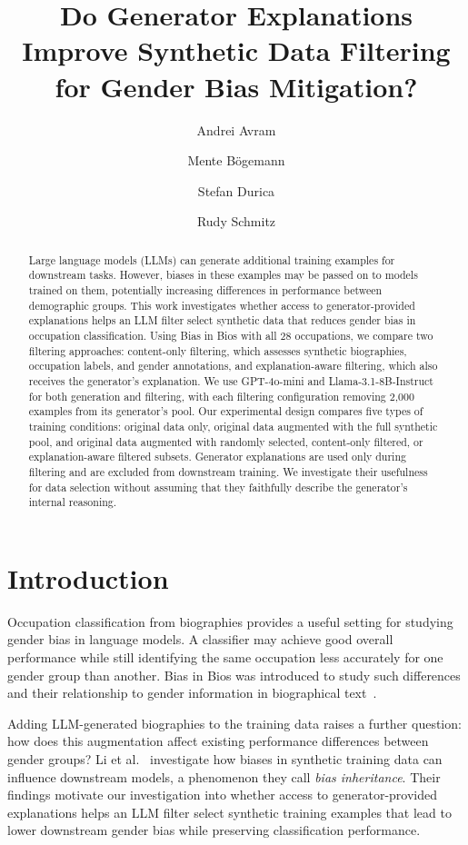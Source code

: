 \documentclass[sigconf]{acmart}
\title{Do Generator Explanations Improve Synthetic Data Filtering for Gender Bias Mitigation?}
\author{Andrei Avram}
\affiliation{%
  \institution{TU/e}
  \city{Eindhoven}
  \country{The Netherlands}}
\author{Mente B\"ogemann}
\affiliation{%
  \institution{TU/e}
  \city{Eindhoven}
  \country{The Netherlands}}
\author{Stefan Durica}
\affiliation{%
  \institution{TU/e}
  \city{Eindhoven}
  \country{The Netherlands}}
\author{Rudy Schmitz}
\affiliation{%
  \institution{TU/e}
  \city{Eindhoven}
  \country{The Netherlands}}
\begin{document}
\begin{abstract}
Large language models (LLMs) can generate additional training examples for downstream tasks. However, biases in these examples may be passed on to models trained on them, potentially increasing differences in performance between demographic groups. This work investigates whether access to generator-provided explanations helps an LLM filter select synthetic data that reduces gender bias in occupation classification. Using Bias in Bios with all 28 occupations, we compare two filtering approaches: content-only filtering, which assesses synthetic biographies, occupation labels, and gender annotations, and explanation-aware filtering, which also receives the generator's explanation. We use GPT-4o-mini and Llama-3.1-8B-Instruct for both generation and filtering, with each filtering configuration removing 2,000 examples from its generator's pool. Our experimental design compares five types of training conditions: original data only, original data augmented with the full synthetic pool, and original data augmented with randomly selected, content-only filtered, or explanation-aware filtered subsets. Generator explanations are used only during filtering and are excluded from downstream training. We investigate their usefulness for data selection without assuming that they faithfully describe the generator's internal reasoning.
\end{abstract}




\maketitle

\section{Introduction}

Occupation classification from biographies provides a useful setting for studying gender bias in language models. A classifier may achieve good overall performance while still identifying the same occupation less accurately for one gender group than another. Bias in Bios was introduced to study such differences and their relationship to gender information in biographical text~\cite{dearteaga2019bios}.

Adding LLM-generated biographies to the training data raises a further question: how does this augmentation affect existing performance differences between gender groups? Li et al.~\cite{li2026inheritance} investigate how biases in synthetic training data can influence downstream models, a phenomenon they call \emph{bias inheritance}. Their findings motivate our investigation into whether access to generator-provided explanations helps an LLM filter select synthetic training examples that lead to lower downstream gender bias while preserving classification performance.
\end{document}
